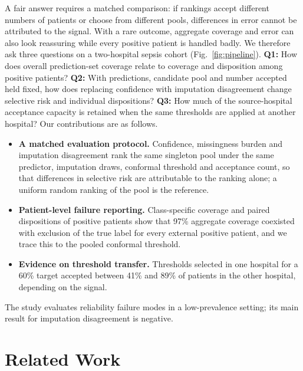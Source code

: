 \documentclass[conference]{IEEEtran}
\begin{document}
A fair answer requires a matched comparison: if rankings accept different numbers of patients or choose from different pools, differences in error cannot be attributed to the signal. With a rare outcome, aggregate coverage and error can also look reassuring while every positive patient is handled badly. We therefore ask three questions on a two-hospital sepsis cohort (Fig.~\ref{fig:pipeline}). \textbf{Q1:} How does overall prediction-set coverage relate to coverage and disposition among positive patients? \textbf{Q2:} With predictions, candidate pool and number accepted held fixed, how does replacing confidence with imputation disagreement change selective risk and individual dispositions? \textbf{Q3:} How much of the source-hospital acceptance capacity is retained when the same thresholds are applied at another hospital? Our contributions are as follows.
\begin{itemize}
\item \textbf{A matched evaluation protocol.} Confidence, missingness burden and imputation disagreement rank the same singleton pool under the same predictor, imputation draws, conformal threshold and acceptance count, so that differences in selective risk are attributable to the ranking alone; a uniform random ranking of the pool is the reference.
\item \textbf{Patient-level failure reporting.} Class-specific coverage and paired dispositions of positive patients show that 97\% aggregate coverage coexisted with exclusion of the true label for every external positive patient, and we trace this to the pooled conformal threshold.
\item \textbf{Evidence on threshold transfer.} Thresholds selected in one hospital for a 60\% target accepted between 41\% and 89\% of patients in the other hospital, depending on the signal.
\end{itemize}
The study evaluates reliability failure modes in a low-prevalence setting; its main result for imputation disagreement is negative.

\section{Related Work}
\end{document}
